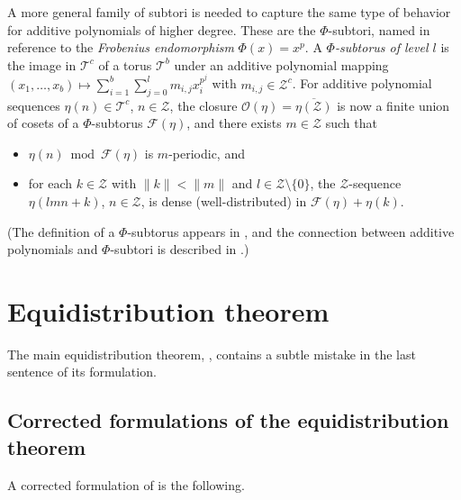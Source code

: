 \documentclass[11pt]{amsart}
\theoremstyle{theorem}
\theoremstyle{definition}
\newcommand{\mZ}{\mathcal{Z}}
\newcommand{\mT}{\mathcal{T}}
\newcommand{\mF}{\mathcal{F}}
\newcommand{\mO}{\mathcal{O}}
\begin{document}
A more general family of subtori is needed to capture the same type of behavior for additive polynomials of higher degree.
These are the $\Phi$-subtori, named in reference to the \emph{Frobenius endomorphism} $\Phi(x) = x^p$.
A \emph{$\Phi$-subtorus of level $l$} is the image in $\mT^c$ of a torus $\mT^b$ under an additive polynomial mapping $(x_1, \ldots, x_b) \mapsto \sum_{i=1}^b \sum_{j=0}^l m_{i,j} x_i^{p^j}$ with $m_{i,j} \in \mZ^c$.
For additive polynomial sequences $\eta(n) \in \mT^c$, $n \in \mZ$, the closure $\mO(\eta) = \overline{\eta(\mZ)}$ is now a finite union of cosets of a $\Phi$-subtorus $\mF(\eta)$, and there exists $m \in \mZ$ such that
\begin{itemize}
	\item	$\eta(n) \bmod{\mF(\eta)}$ is $m$-periodic, and
	\item	for each $k \in \mZ$ with $\|k\| < \|m\|$ and $l \in \mZ \setminus \{0\}$, the $\mZ$-sequence $\eta(lmn+k)$, $n \in \mZ$, is dense (well-distributed) in $\mF(\eta) + \eta(k)$.
\end{itemize}
(The definition of a $\Phi$-subtorus appears in \cite[Section 1]{bl}, and the connection between additive polynomials and $\Phi$-subtori is described in \cite[Section 7]{bl}.)


\section{Equidistribution theorem} \label{sec: equidistribution}

The main equidistribution theorem, \cite[Theorem 0.3]{bl}, contains a subtle mistake in the last sentence of its formulation.


\subsection{Corrected formulations of the equidistribution theorem}

A corrected formulation of \cite[Theorem 0.3]{bl} is the following.
\end{document}
